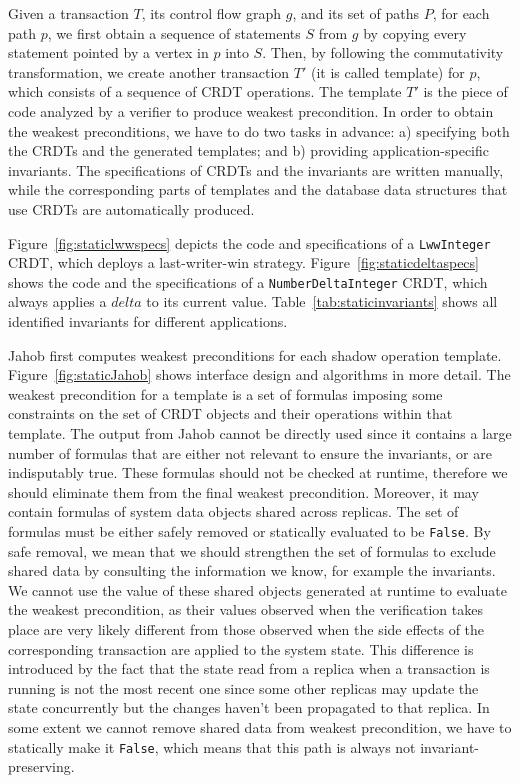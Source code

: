Given a transaction $T$, its control flow graph $g$, and its set of paths $P$, for each path $p$, we 
first obtain a sequence of statements $S$ from $g$ by copying every statement pointed by
a vertex in $p$ into $S$. Then, by following the commutativity transformation,
we create another transaction $T'$ (it is called template) for $p$, which
consists of a sequence of CRDT operations. The template $T'$ is the piece of
code analyzed by a verifier to produce weakest precondition.
In order to obtain the weakest preconditions, we have to do two tasks in advance: a)
specifying both the CRDTs and the generated templates; and b) providing application-specific
invariants. The specifications of CRDTs and the invariants are written manually, while
the corresponding parts of templates and the database data structures that use CRDTs 
are automatically produced. 

Figure~\ref{fig:staticlwwspecs} depicts the code and specifications of a \texttt{LwwInteger} CRDT, which
deploys a last-writer-win strategy. Figure~\ref{fig:staticdeltaspecs} shows the code and
the specifications of a \texttt{NumberDeltaInteger} CRDT, which always applies a $delta$ to
its current value. Table~\ref{tab:staticinvariants} shows all identified invariants for different applications.


Jahob first computes weakest preconditions for each shadow operation template. Figure~\ref{fig:staticJahob}
shows interface design and algorithms in more detail. The weakest precondition for a template
is a set of formulas imposing some constraints on the set of CRDT objects and their operations within
that template. The output from Jahob cannot be directly used since it contains a large number
of formulas that are either not relevant to ensure the invariants, or are indisputably true. These
formulas should not be checked at runtime, therefore we should eliminate them from the final weakest
precondition. Moreover, it may contain formulas of system data objects shared across replicas. The
set of formulas must be either safely removed or statically evaluated to be \texttt{False}. By safe
removal, we mean that we should strengthen the set of formulas to exclude shared data by
consulting the information we know, for example the invariants. We cannot use the value of 
these shared objects generated at runtime to evaluate the weakest precondition, as their values
observed when the verification takes place are very likely different from those observed
when the side effects of the corresponding transaction are applied to the system state. This difference is
introduced by the fact that the state read from a replica when a transaction is running is not the most
recent one since some other replicas may update the state concurrently but the changes haven't been
propagated to that replica. In some extent we cannot remove shared data from weakest precondition, 
we have to statically make it \texttt{False}, which means that this path is always not invariant-preserving.

